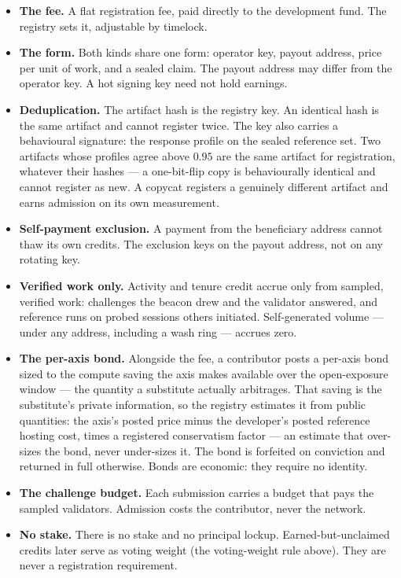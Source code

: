 \documentclass[11pt]{article}
\begin{document}
\begin{itemize}
\item \textbf{The fee.} A flat registration fee, paid directly to
the development fund. The registry sets it, adjustable by
timelock.
\item \textbf{The form.} Both kinds share one form: operator key,
payout address, price per unit of work, and a sealed claim. The
payout address may differ from the operator key. A hot signing
key need not hold earnings.
\item \textbf{Deduplication.} The artifact hash is the registry
key. An identical hash is the same artifact and cannot register
twice. The key also carries a behavioural signature: the
response profile on the sealed reference set. Two artifacts whose
profiles agree above $0.95$ are the same artifact for
registration, whatever their hashes --- a one-bit-flip copy is
behaviourally identical and cannot register as new. A copycat
registers a genuinely different artifact and earns admission on
its own measurement.
\item \textbf{Self-payment exclusion.} A payment from the
beneficiary address cannot thaw its own credits. The exclusion
keys on the payout address, not on any rotating key.
\item \textbf{Verified work only.} Activity and tenure
credit accrue only from sampled, verified work: challenges the
beacon drew and the validator answered, and reference runs on
probed sessions others initiated. Self-generated volume --- under
any address, including a wash ring --- accrues zero.
\item \textbf{The per-axis bond.} Alongside the fee, a
contributor posts a per-axis bond sized to the compute saving the
axis makes available over the open-exposure window --- the
quantity a substitute actually arbitrages. That saving is the
substitute's private information, so the registry estimates it
from public quantities: the axis's posted price minus the
developer's posted reference hosting cost, times a registered
conservatism factor --- an estimate that over-sizes the bond,
never under-sizes it. The bond is forfeited
on conviction and returned in full otherwise. Bonds are economic:
they require no identity.
\item \textbf{The challenge budget.} Each submission carries a
budget that pays the sampled validators. Admission costs the
contributor, never the network.
\item \textbf{No stake.} There is no stake and no principal
lockup. Earned-but-unclaimed credits later serve as voting
weight (the voting-weight rule above). They are never a
registration requirement.
\end{itemize}
\end{document}
